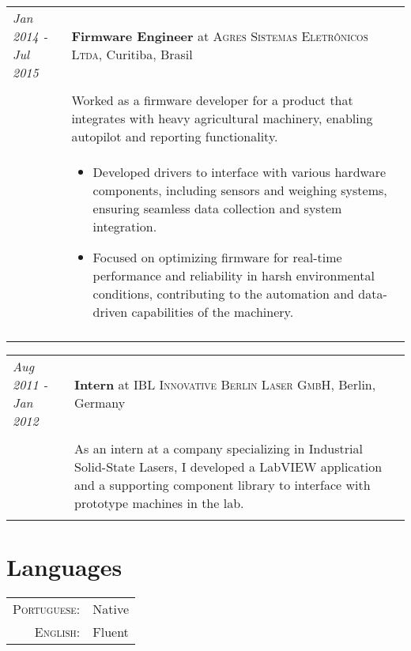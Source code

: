 \documentclass[a4paper,10pt]{article}
\begin{document}
    \begin{tabular}{@{} p{2.8cm} | p{12.2cm} @{}}
        \emph{Jan 2014 - Jul 2015}
        &\textbf{Firmware Engineer} at \textsc
        {Agres Sistemas Eletrônicos Ltda}, Curitiba, Brasil \\ \\

        &\normalsize
        {
            Worked as a firmware developer for a product that integrates
            with heavy agricultural machinery, enabling autopilot and
            reporting functionality.
        } \\
        & \begin{itemize}[leftmargin=*]
            \item Developed drivers to interface with various hardware
            components, including sensors and weighing systems, ensuring
            seamless data collection and system integration.

            \item Focused on optimizing firmware for real-time performance
            and reliability in harsh environmental conditions, contributing
            to the automation and data-driven capabilities of the machinery.

        \end{itemize} \\
        \multicolumn{2}{c}{}
    \end{tabular}

    \begin{tabular}{@{} p{2.8cm} | p{12.2cm} @{}}
        \emph{Aug 2011 - Jan 2012}
        &\textbf{Intern} at \textsc
        {IBL Innovative Berlin Laser GmbH}, Berlin, Germany \\ \\

        &\normalsize
        {
            As an intern at a company specializing in Industrial
            Solid-State Lasers, I developed a LabVIEW application
            and a supporting component library to interface with
            prototype machines in the lab.
        } \\
        \multicolumn{2}{c}{}
    \end{tabular}

\section*{Languages}
\begin{tabular}{@{} r p{10cm} @{}}
    \textsc{Portuguese:} & Native \\
    \textsc{English:}    & Fluent \\
\end{tabular}
\end{document}
